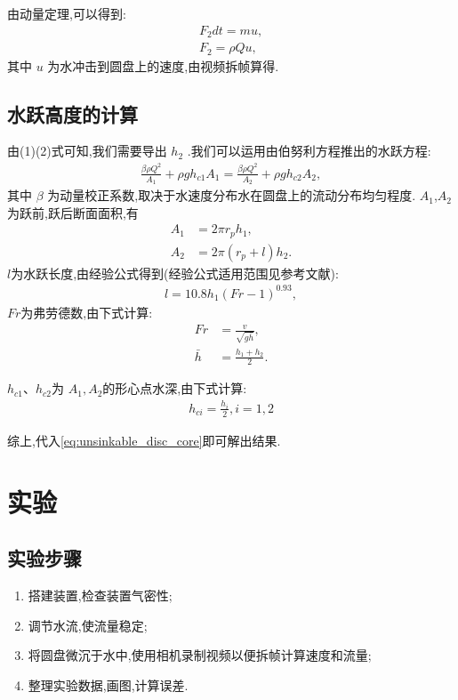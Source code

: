 \documentclass[UTF8]{gapd}
\begin{document}
由动量定理,可以得到:
\begin{align}
    F_2dt=mu,\\
    F_2=\rho Q u,
\end{align}
其中 $u$  为水冲击到圆盘上的速度,由视频拆帧算得.
\subsection{水跃高度的计算}
由(1)(2)式可知,我们需要导出  $h_2$  .我们可以运用由伯努利方程推出的水跃方程\cite{article:1}:
\begin{align}
    \frac{\beta \rho Q^2}{A_1}+\rho g h_{c1}A_1=\frac{\beta \rho Q^2}{A_2}+\rho g h_{c2}A_2,
\end{align}
其中  $\beta$ 为动量校正系数,取决于水速度分布水在圆盘上的流动分布均匀程度.
$A_1$,$A_2$为跃前,跃后断面面积,有
\begin{align}
    A_1&=2\pi r_p h_1,\\
    A_2&=2\pi(r_p+l)h_2.
\end{align}
$l$为水跃长度,由经验公式得到(经验公式适用范围见参考文献\cite{book:1}):
\begin{align}
    l=10.8h_1(Fr-1)^{0.93},
\end{align}
$Fr$为弗劳德数,由下式计算\cite{article:2}:
\begin{align}
    Fr&=\frac{v}{\sqrt{g \bar{h}}},\\
    \bar{h}&=\frac{h_1+h_2}{2}.
\end{align}

$h_{c1}$、$h_{c2}$为 $A_1,A_2$的形心点水深,由下式计算:
\begin{align}
    h_{ci}=\frac{h_i}{2},i=1,2
\end{align}

综上,代入\eqref{eq:unsinkable_disc_core}即可解出结果.

\section{实验}
\label{sec:unsinkable_disc_experiment}
\subsection{实验步骤}
\begin{enumerate}
    \item 搭建装置,检查装置气密性;
    \item 调节水流,使流量稳定;
    \item 将圆盘微沉于水中,使用相机录制视频以便拆帧计算速度和流量;
    \item 整理实验数据,画图,计算误差.
\end{enumerate}
\end{document}
